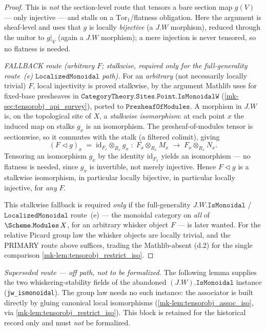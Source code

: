 \begin{proof}
  This is \emph{not} the section-level route that tensors a bare section map \(g(V)\)
  --- only injective --- and stalls on a \(\mathrm{Tor}_1\)/flatness obligation. Here
  the argument is sheaf-level and uses that \(g\) is locally \emph{bijective} (a
  \(J.W\) morphism), reduced through the unitor to \(g|_V\) (again a \(J.W\)
  morphism); a mere injection is never tensored, so no flatness is needed.

  \emph{FALLBACK route (arbitrary \(F\); stalkwise, required only for the
  full-generality route~(e) \(\mathtt{LocalizedMonoidal}\) path).} For an
  \emph{arbitrary} (not necessarily locally trivial) \(F\), local injectivity is
  proved stalkwise, by the argument Mathlib uses for fixed-base presheaves in
  \(\mathtt{CategoryTheory.Sites.Point.IsMonoidalW}\)
  (\ref{mk-sec:tensorobj_api_survey}), ported to \(\mathtt{PresheafOfModules}\). A
  morphism in \(J.W\) is, on the topological site of \(X\), a \emph{stalkwise
  isomorphism}: at each point \(x\) the induced map on stalks \(g_x\) is an
  isomorphism. The presheaf-of-modules tensor is sectionwise, so it commutes with
  the stalk (a filtered colimit), giving
  \[
    (F \triangleleft g)_x
      \;=\; \mathrm{id}_{F_x} \otimes_{R_x} g_x
      \;\colon\; F_x \otimes_{R_x} M_x \;\longrightarrow\; F_x \otimes_{R_x} N_x .
  \]
  Tensoring an isomorphism \(g_x\) by the identity \(\mathrm{id}_{F_x}\) yields an
  isomorphism --- no flatness is needed, since \(g_x\) is invertible, not merely
  injective. Hence \(F \triangleleft g\) is a stalkwise isomorphism, in particular
  locally bijective, in particular locally injective, for \emph{any} \(F\).

  This stalkwise fallback is required \emph{only} if the full-generality
  \(J.W.\mathtt{IsMonoidal}\) / \(\mathtt{LocalizedMonoidal}\) route~(e) --- the
  monoidal category on \emph{all} of \(\Scheme.\mathtt{Modules}\,X\), for an
  arbitrary whisker object \(F\) --- is later wanted. For the relative Picard group
  law the whisker objects are locally trivial, and the PRIMARY route above suffices,
  trading the Mathlib-absent (d.2) for the single comparison
  \ref{mk-lem:tensorobj_restrict_iso}.
\end{proof}

\emph{Superseded route --- off path, not to be formalized.} The following lemma
supplies the two whiskering-stability fields of the abandoned
\((J.W).\mathtt{IsMonoidal}\) instance (\texttt{jw\_ismonoidal}). The group law
needs no such instance: the associator is built directly by gluing canonical local
isomorphisms (\ref{mk-lem:tensorobj_assoc_iso}, via \ref{mk-lem:tensorobj_restrict_iso}).
This block is retained for the historical record only and must \emph{not} be
formalized.

